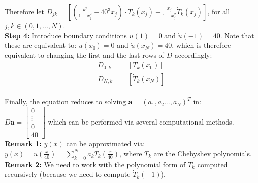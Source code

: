 \documentclass[12pt, a4paper]{article}
\begin{document}
Therefore let $D_{jk} = [(\frac{k^2}{1-x_j^2} - 40^3x_j) \cdot T_k(x_j) + \frac{x_j}{1-x_j^2}\dot{T}_k(x_j)]$, for all  $j,k \in (0,1,...,N)$.\vspace{3.0mm} \\ 
\textbf{Step 4:} Introduce boundary conditions $u(1) = 0$ and $\dot{u}(-1)=40$. Note that these are equivalent to: $u(x_0)=0$ and $\dot{u}(x_N)=40$, which is therefore equivalent to changing the first and the last rows of $D$ accordingly:
\begin{equation*}
\begin{split}
	D_{0,k} & = [T_k(x_0)]  \\
	D_{N,k} & = [\dot{T}_k(x_N)]
\end{split}
\end{equation*}\\
Finally, the equation reduces to solving $\textbf{a}=(a_1, a_2 ..., a_N)^T$ in: \\ $D\textbf{a}=\begin{bmatrix} 0 \\ \vdots \\0 \\ 40 \end{bmatrix}$ which can be performed via several computational methods.\\
\textbf{Remark 1:} $y(x)$ can be approximated via: $y(x)=u(\frac{x}{40})=\sum_{k=0}^{N}{a_{k}T_{k}(\frac{x}{40})}$, where $T_k$ are the Chebyshev polynomials.\\
\textbf{Remark 2:} We need to work with the polynomial form of $T_{k}$ computed recursively (because we need to compute $\dot{T}_k(-1)$).
\end{document}

